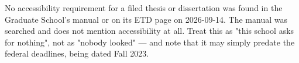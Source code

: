 %
%


	{No accessibility requirement for a filed thesis or dissertation was found
	 in the Graduate School's manual or on its ETD page on 2026-09-14. The
	 manual was searched and does not mention accessibility at all. Treat this
	 as "this school asks for nothing", not as "nobody looked" — and note that
	 it may simply predate the federal deadlines, being dated Fall 2023.}

